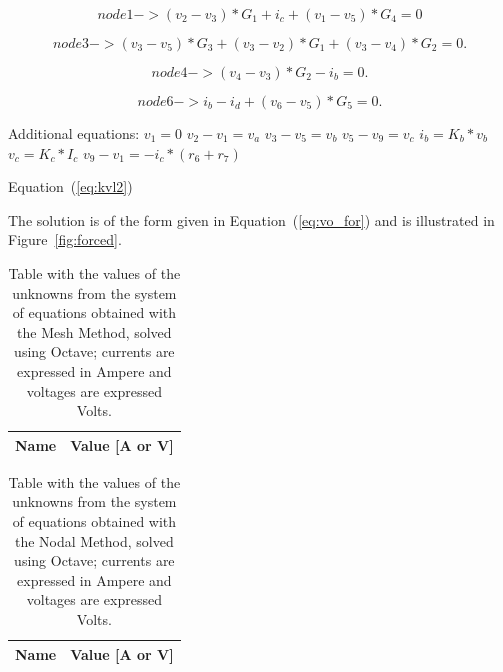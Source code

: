 \begin{equation}
  node 1 -> (v_2 - v_3)*G_1 + i_c +(v_1 - v_5)*G_4 = 0
\end{equation}

\begin{equation}
  node 3 -> (v_3 - v_5)*G_3 + (v_3 - v_2)*G_1 + (v_3 - v_4)*G_2 = 0.
  \label{eq:kvl}
\end{equation}

\begin{equation}
  node 4 -> (v_4 - v_3)*G_2 - i_b = 0.
\end{equation}

\begin{equation}
  node 6 -> i_b - i_d + (v_6 - v_5)*G_5 = 0.
  \label{eq:kvl2}
\end{equation}

Additional equations:
$v_1= 0$
$v_2 - v_1 = v_a$
$v_3 - v_5 = v_b$
$v_5 - v_9 = v_c$
$i_b = K_b*v_b$
$v_c = K_c*I_c$
$v_9 - v_1 = -i_c*(r_6 + r_7)$

Equation~(\ref{eq:kvl2}) 

The solution is of the form given in Equation~(\ref{eq:vo_for}) and is
illustrated in Figure~\ref{fig:forced}.





\begin{table}[h]
  \centering
  \begin{tabular}{|l|r|}
    \hline    
    {\bf Name} & {\bf Value [A or V]} \\ \hline
    
  \end{tabular}
  \caption{Table with the values of the unknowns from the system of equations obtained with the Mesh Method, solved using Octave; currents are expressed in Ampere and voltages are expressed Volts.}
  \label{tab:op}
\end{table}

\begin{table}[h]
  \centering
  \begin{tabular}{|l|r|}
    \hline    
    {\bf Name} & {\bf Value [A or V]} \\ \hline
    
  \end{tabular}
  \caption{Table with the values of the unknowns from the system of equations obtained with the Nodal Method, solved using Octave; currents are expressed in Ampere and voltages are expressed Volts.}
  \label{tab:op}
\end{table}




